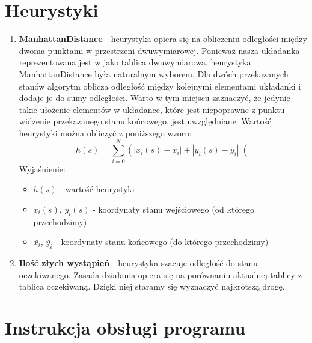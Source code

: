 \documentclass{classrep}
\begin{document}
	\section{Heurystyki}
		\begin{enumerate}
			\item \textbf{ManhattanDistance} - heurystyka opiera się na obliczeniu odległości między dwoma punktami
			w przestrzeni dwuwymiarowej. Ponieważ nasza układanka reprezentowana jest w jako tablica dwuwymiarowa,
			heurystyka ManhattanDistance była naturalnym wyborem. Dla dwóch przekazanych stanów algorytm
			oblicza odległość między kolejnymi elementami układanki i dodaje je do sumy odległości. Warto w tym
			miejscu zaznaczyć, że jedynie takie ułożenie elementów w układance, które jest niepoprawne z punktu
			widzenie przekazanego stanu końcowego, jest uwzględniane. 
			Wartość heurystyki można obliczyć z poniższego wzoru:
			\begin{equation}
				h(s) = \sum_{i=0}^{N} \left(  | x_i(s) - \bar{x_i} | + | y_i(s) - \bar{y_i} | \right( 
			\end{equation}
			Wyjaśnienie:
			\begin{itemize}
				\item $h(s)$ - wartość heurystyki
				\item $x_i(s)$, $y_i(s)$ - koordynaty stanu wejściowego (od którego przechodzimy)
				\item $\bar{x_i}$, $\bar{y_i}$ - koordynaty stanu końcowego (do którego przechodzimy)
			\end{itemize}
		\item \textbf{Ilość złych wystąpień} - heurystyka szacuje odległość do stanu oczekiwanego. Zasada działania opiera się na porównaniu aktualnej tablicy z tablica oczekiwaną. Dzięki niej staramy się wyznaczyć najkrótszą drogę.
		\end{enumerate}
		
	\section{Instrukcja obsługi programu}
\end{document}
